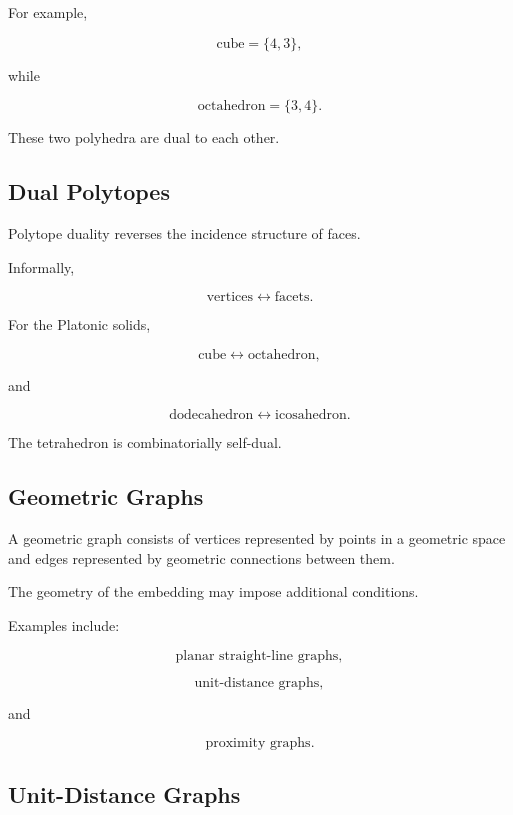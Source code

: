 For example,

\[
\boxed{
\text{cube}=\{4,3\},
}
\]

while

\[
\boxed{
\text{octahedron}=\{3,4\}.
}
\]

These two polyhedra are dual to each other.

\subsection{Dual Polytopes}
\label{subsec:dual-polytopes}

Polytope duality reverses the incidence structure of faces.

Informally,

\[
\boxed{
\text{vertices}
\longleftrightarrow
\text{facets}.
}
\]

For the Platonic solids,

\[
\boxed{
\text{cube}
\longleftrightarrow
\text{octahedron},
}
\]

and

\[
\boxed{
\text{dodecahedron}
\longleftrightarrow
\text{icosahedron}.
}
\]

The tetrahedron is combinatorially self-dual.

\subsection{Geometric Graphs}
\label{subsec:geometric-graphs}

A geometric graph consists of vertices represented by points in a geometric
space and edges represented by geometric connections between them.

The geometry of the embedding may impose additional conditions.

Examples include:

\[
\boxed{
\text{planar straight-line graphs},
}
\]

\[
\boxed{
\text{unit-distance graphs},
}
\]

and

\[
\boxed{
\text{proximity graphs}.
}
\]

\subsection{Unit-Distance Graphs}
\label{subsec:unit-distance-graphs}

